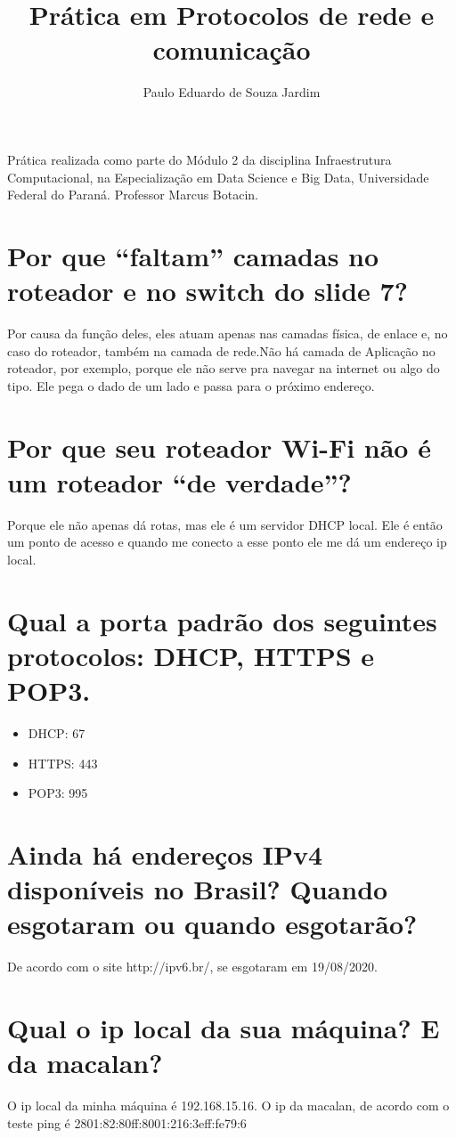 \documentclass{article}
\title{Prática em Protocolos de rede e comunicação}
\author{Paulo Eduardo de Souza Jardim}
\begin{document}
\maketitle

\begin{large} 
  Prática realizada como parte do Módulo 2 da disciplina Infraestrutura Computacional, na Especialização em Data Science e Big Data, Universidade Federal do Paraná. Professor Marcus Botacin.
\end{large} 

\section{Por que “faltam” camadas no roteador e no switch do slide 7?}
Por causa da função deles, eles atuam apenas nas camadas física, de enlace e, no caso do roteador, também na camada de rede.Não há camada de Aplicação no roteador, por exemplo, porque ele não serve pra navegar na internet ou algo do tipo. Ele pega o dado de um lado e passa para o próximo endereço. 

\section{Por que seu roteador Wi-Fi não é um roteador “de verdade”?}
Porque ele não apenas dá rotas, mas ele é um servidor DHCP local. Ele é então um ponto de acesso e quando me conecto a esse ponto ele me dá um endereço ip local. 

\section{Qual a porta padrão dos seguintes protocolos: DHCP, HTTPS e POP3.}

\begin{itemize}
    \item DHCP: 67
    \item HTTPS: 443
    \item POP3: 995
\end{itemize}

\section{Ainda há endereços IPv4 disponíveis no Brasil? Quando esgotaram ou quando esgotarão?}
De acordo com o site http://ipv6.br/, se esgotaram em 19/08/2020.


\section{Qual o ip local da sua máquina? E da macalan?}
O ip local da minha máquina é 192.168.15.16. O ip da macalan, de acordo com o teste ping é 2801:82:80ff:8001:216:3eff:fe79:6
\end{document}
